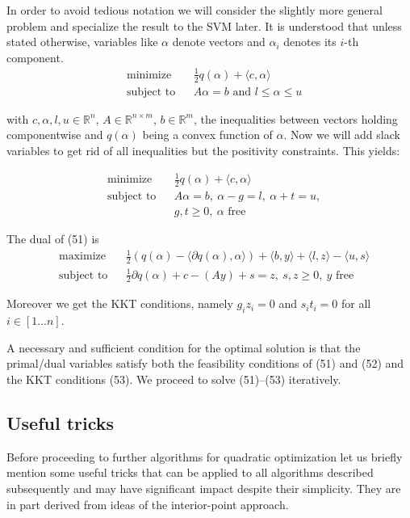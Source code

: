 \documentclass[fleqn,10pt]{olplainarticle}
\begin{document}
In order to avoid tedious notation we will consider the slightly more general problem and specialize the result to the SVM later. It is understood that unless stated otherwise, variables like $\alpha$ denote vectors and $\alpha_i$ denotes its $i$-th component.
\[
\begin{aligned}
    &\text{minimize} && \frac{1}{2} q(\alpha) + \langle c, \alpha \rangle \\
    &\text{subject to} && A\alpha = b \text{ and } l \leq \alpha \leq u
\end{aligned}
\]

with $c, \alpha, l, u \in \mathbb{R}^n$, $A \in \mathbb{R}^{n \times m}$, $b \in \mathbb{R}^m$, the inequalities between vectors holding componentwise and $q(\alpha)$ being a convex function of $\alpha$. Now we will add slack variables to get rid of all inequalities but the positivity constraints. This yields:

\[
\begin{aligned}
    &\text{minimize} && \frac{1}{2} q(\alpha) + \langle c, \alpha \rangle \\
    &\text{subject to} && A\alpha = b, \ \alpha - g = l, \ \alpha + t = u, \\
    &&& g, t \geq 0, \ \alpha \text{ free}
\end{aligned}
\]

The dual of (51) is
\[
\begin{aligned}
    &\text{maximize} && \frac{1}{2} \left(q(\alpha) - \langle \partial q(\alpha), \alpha \rangle\right) + \langle b, y \rangle + \langle l, z \rangle - \langle u, s \rangle \\
    &\text{subject to} && \frac{1}{2} \partial q(\alpha) + c - (Ay) + s = z, \ s, z \geq 0, \ y \text{ free}
\end{aligned}
\]

Moreover we get the KKT conditions, namely $g_i z_i = 0$ and $s_i t_i = 0$ for all $i \in [1 . . . n]$.

A necessary and sufficient condition for the optimal solution is that the primal/dual variables satisfy both the feasibility conditions of (51) and (52) and the KKT conditions (53). We proceed to solve (51)–(53) iteratively.

\subsection{Useful tricks}

Before proceeding to further algorithms for quadratic optimization let us briefly mention some useful tricks that can be applied to all algorithms described subsequently and may have significant impact despite their simplicity. They are in part derived from ideas of the interior-point approach.
\end{document}
